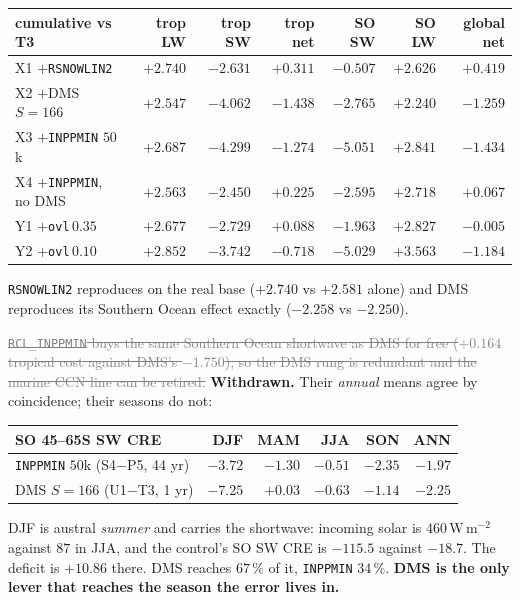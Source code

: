 \documentclass[10pt]{article}
\newcommand{\dead}[1]{\textcolor{gray}{\sout{#1}}}
\begin{document}
\begin{center}\footnotesize
\begin{tabular}{l r r r r r r}
\toprule
cumulative vs T3 & trop LW & trop SW & trop net & SO SW & SO LW & global net \\
\midrule
X1 $+$\texttt{RSNOWLIN2} & $+2.740$ & $-2.631$ & $+0.311$ & $-0.507$ & $+2.626$ & $+0.419$ \\
X2 $+$DMS $S{=}166$ & $+2.547$ & $-4.062$ & $-1.438$ & $-2.765$ & $+2.240$ & $-1.259$ \\
X3 $+$\texttt{INPPMIN} $50$k & $+2.687$ & $-4.299$ & $-1.274$ & $\mathbf{-5.051}$ & $+2.841$ & $-1.434$ \\
X4 $+$\texttt{INPPMIN}, no DMS & $+2.563$ & $-2.450$ & $+0.225$ & $-2.595$ & $+2.718$ & $+0.067$ \\
Y1 $+$\texttt{ovl}$\,0.35$ & $+2.677$ & $-2.729$ & $+0.088$ & $-1.963$ & $+2.827$ & $-0.005$ \\
Y2 $+$\texttt{ovl}$\,0.10$ & $+2.852$ & $-3.742$ & $-0.718$ & $-5.029$ & $+3.563$ & $-1.184$ \\
\bottomrule
\end{tabular}
\end{center}

\noindent \texttt{RSNOWLIN2} reproduces on the real base ($+2.740$ vs $+2.581$ alone) and
DMS reproduces its Southern Ocean effect exactly ($-2.258$ vs $-2.250$).

\dead{\texttt{RCL\_INPPMIN} buys the same Southern Ocean shortwave as DMS for free
($+0.164$ tropical cost against DMS's $-1.750$), so the DMS rung is redundant and the
marine CCN line can be retired.} \textbf{Withdrawn.} Their \emph{annual} means agree by
coincidence; their seasons do not:

\begin{center}\footnotesize
\begin{tabular}{l r r r r r}
\toprule
SO 45--65S SW CRE & DJF & MAM & JJA & SON & ANN \\
\midrule
\texttt{INPPMIN} $50$k (S4$-$P5, 44 yr) & $-3.72$ & $-1.30$ & $-0.51$ & $-2.35$ & $-1.97$ \\
DMS $S{=}166$ (U1$-$T3, 1 yr) & $\mathbf{-7.25}$ & $+0.03$ & $-0.63$ & $-1.14$ & $-2.25$ \\
\bottomrule
\end{tabular}
\end{center}

\noindent DJF is austral \emph{summer} and carries the shortwave: incoming solar is
$460$\,W\,m$^{-2}$ against $87$ in JJA, and the control's SO SW CRE is $-115.5$ against
$-18.7$. The deficit is $+10.86$ there. DMS reaches $67\,\%$ of it, \texttt{INPPMIN}
$34\,\%$. \textbf{DMS is the only lever that reaches the season the error lives in.}
\end{document}
